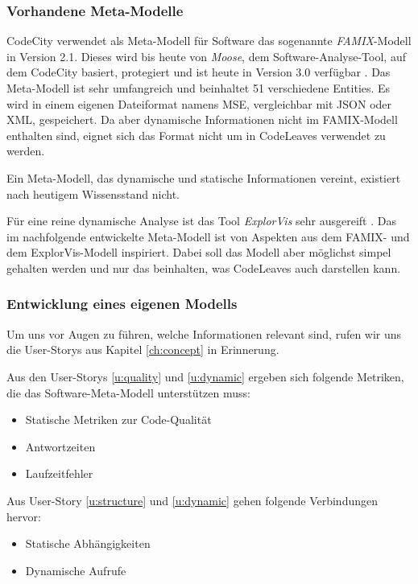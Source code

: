 \subsubsection*{Vorhandene Meta-Modelle}

CodeCity verwendet als Meta-Modell für Software das sogenannte \textit{FAMIX}-Modell in Version 2.1. Dieses wird bis heute von \textit{Moose}, dem Software-Analyse-Tool, auf dem CodeCity basiert, protegiert und ist heute in Version 3.0 verfügbar \cite{merrill1916moose}. Das Meta-Modell ist sehr umfangreich und beinhaltet 51 verschiedene Entities. Es wird in einem eigenen Dateiformat namens MSE, vergleichbar mit JSON oder XML, gespeichert. Da aber dynamische Informationen nicht im FAMIX-Modell enthalten sind, eignet sich das Format nicht um in CodeLeaves verwendet zu werden.

Ein Meta-Modell, das dynamische und statische Informationen vereint, existiert nach heutigem Wissensstand nicht.

Für eine reine dynamische Analyse ist das Tool \textit{ExplorVis} sehr ausgereift \cite{fittkau2017software}. Das im nachfolgende entwickelte Meta-Modell ist von Aspekten aus dem FAMIX- und dem ExplorVis-Modell inspiriert. Dabei soll das Modell aber möglichst simpel gehalten werden und nur das beinhalten, was CodeLeaves auch darstellen kann.

\subsubsection*{Entwicklung eines eigenen Modells}

Um uns vor Augen zu führen, welche Informationen relevant sind, rufen wir uns die User-Storys aus Kapitel \ref{ch:concept} in Erinnerung.

Aus den User-Storys \ref{u:quality} und \ref{u:dynamic} ergeben sich folgende Metriken, die das Software-Meta-Modell unterstützen muss:

\begin{itemize}
  \item Statische Metriken zur Code-Qualität
  \item Antwortzeiten
  \item Laufzeitfehler
\end{itemize}

Aus User-Story \ref{u:structure} und \ref{u:dynamic} gehen folgende Verbindungen hervor:

\begin{itemize}
  \item Statische Abhängigkeiten
  \item Dynamische Aufrufe
\end{itemize}

